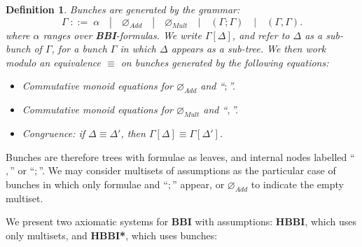 \documentclass[a4paper]{article}
\newtheorem{definition}[theorem]{Definition}
\newcommand{\BBI}{\textbf{BBI}\xspace}
\begin{document}
\begin{definition}\emph{Bunches} are generated by the grammar:
\[
  \Gamma \;::=\; \alpha \quad|\quad \varnothing_{Add} \quad|\quad \varnothing_{Mult} \quad|\quad (\Gamma ;\Gamma)
  \quad|\quad (\Gamma , \Gamma).
\]
where $\alpha$ ranges over \BBI-formulas.
We write $\Gamma[\Delta]$, and refer to $\Delta$ as a sub-bunch of $\Gamma$, for a bunch $\Gamma$ in which $\Delta$ appears as a sub-tree.
We then work modulo an equivalence $\equiv$ on bunches generated by the following equations:
\begin{itemize}
    \item[1.] Commutative monoid equations for $\varnothing_{Add}$ and ``$;$''.
    \item[2.] Commutative monoid equations for $\varnothing_{Mult}$ and ``$,$''.
    \item[3.] Congruence: if $\Delta\equiv\Delta'$, then $\Gamma[\Delta] \equiv \Gamma[\Delta']$.
\end{itemize}
\end{definition}

Bunches are therefore trees with formulae as leaves, and internal nodes labelled ``$,$'' or ``$;$''.
We may consider multisets of assumptions as the particular case of bunches in which only formulae and ``$;$'' appear,
or $\varnothing_{Add}$ to indicate the empty multiset.

We present two axiomatic systems for \BBI with assumptions: \textbf{HBBI}, which uses only multisets,
and \textbf{HBBI*}, which uses bunches:
\end{document}
